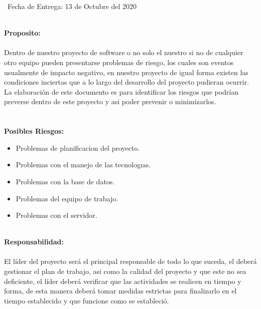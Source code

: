 \documentclass[40pt]{article}
\begin{document}
\maketitle
\textsf{\ Fecha de Entrega: 13 de Octubre del 2020 \\}

\newpage

\maketitle
\textsf{\ \\
\textbf{Proposito:}\\
\\
Dentro de nuestro proyecto de software o no solo el nuestro si no de cualquier otro equipo pueden presentarse problemas de riesgo, los cuales son eventos usualmente de impacto negativo, en nuestro proyecto de igual forma existen las condiciones inciertas que a lo largo del desarrollo del proyecto pudieran ocurrir. La elaboración de este documento es para identificar los riesgos que podrían preverse dentro de este proyecto y asi poder prevenir o minimizarlos. \\}
\\
\\
\textbf{Posibles Riesgos:}
\begin{itemize}
    \item Problemas de planificacion del proyecto.
    \item Problemas con el manejo de las tecnologıas.
    \item Problemas con la base de datos.
    \item Problemas del equipo de trabajo.
    \item Problemas con el servidor.   
\end{itemize}



\maketitle
\textsf{\ 
\\
\textbf{Responsabilidad:}\\
\\
El líder del proyecto será el principal responsable de todo lo que suceda, el deberá gestionar el plan de trabajo, asi como la calidad del proyecto y que este no sea deficiente, el líder deberá verificar que las actividades se realicen en tiempo y forma, de esta manera deberá tomar medidas estrictas para finalizarlo en el tiempo establecido y que funcione como se estableció. \\}
\end{document}
